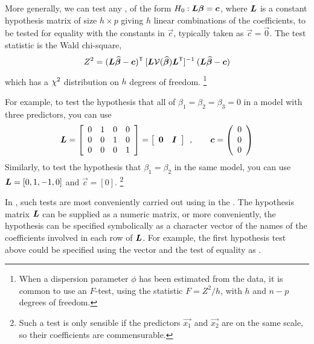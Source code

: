 \documentclass[11pt]{book}\usepackage[]{graphicx}\usepackage[]{color}
\begin{document}
More generally, we can test any , of the form 
$H_0 : \bm{L} \bm{\beta} = \bm{c}$, where $\bm{L}$ is a constant hypothesis matrix
of size $h \times p$ giving $h$ linear combinations of the coefficients,
to be tested for equality with the constants in $\vec{c}$, typically taken as $\vec{c}=\vec{0}$.
The test statistic is the Wald chi-square,
\begin{equation}
Z^2 = (\bm{L} \widehat{\bm{\beta}} - \bm{c})^\mathsf{T} \:
      [\bm{L} \mathcal{V} (\widehat{\bm{\beta}}) \bm{L}^\mathsf{T}]^{-1} \:
      (\bm{L} \widehat{\bm{\beta}} - \bm{c})
\end{equation}
which has a $\chi^2$ distribution on $h$ degrees of freedom.%
\footnote{When a dispersion parameter $\phi$ has been estimated from the data,
it is common to use an $F$-test, using the statistic $F = Z^2 / h$,
with $h$ and $n-p$ degrees of freedom.}

For example, to test the hypothesis
that all of 
$\beta_1 = \beta_2 = \beta_3 =0$ in a model with three predictors, you can use
\begin{equation*}
\mat{L} = \left[ 
{\begin{array}{*{20}{c}}
0 & 1 & 0 & 0\\
0 & 0 & 1 & 0\\
0 & 0 & 0 &1
\end{array}} 
\right] =
\left[ 
{\begin{array}{*{20}{c}}
{\vec{0}} & {\mat{I}}
\end{array}} 
\right]
\comma
\quad\quad
\vec{c} = \left( 
{\begin{array}{*{20}{c}}
0\\
0\\
0
\end{array}} 
\right)
\end{equation*}
Similarly, to test the hypothesis that $\beta_1 = \beta_2$ in the same model,
you can use $\bm{L} = [0, 1, -1, 0]$ and $\vec{c} = [0]$.%
\footnote{Such a test is only sensible if the predictors $\vec{x_1}$ and $\vec{x_2}$
are on the same scale, so their coefficients are commensurable.}

In \R, such tests are most conveniently carried out using 
in the .  The hypothesis matrix $\bm{L}$ can be supplied as a
numeric matrix, or more conveniently,
the hypothesis can be specified symbolically as a character vector 
of the names of the coefficients involved in each row of $\bm{L}$.
For example, the first hypothesis test above could be specified using the vector
 and the test of equality as
.  
\end{document}
